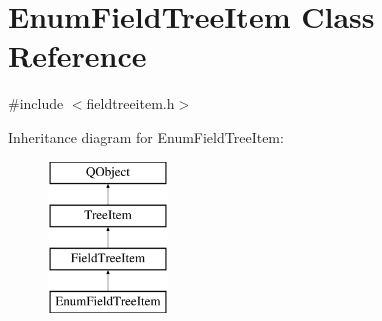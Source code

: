 \hypertarget{class_enum_field_tree_item}{\section{Enum\-Field\-Tree\-Item Class Reference}
\label{class_enum_field_tree_item}
}


{\ttfamily \#include $<$fieldtreeitem.\-h$>$}

Inheritance diagram for Enum\-Field\-Tree\-Item\-:\begin{figure}[H]
\begin{center}
\leavevmode
\includegraphics[height=4.000000cm]{class_enum_field_tree_item}
\end{center}
\end{figure}
